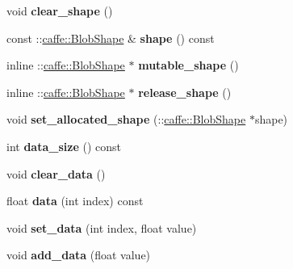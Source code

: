 \begin{DoxyCompactItemize}
void {\bfseries clear\+\_\+shape} ()
\item 
\mbox{\label{classcaffe_1_1_blob_proto_a7e21c24dadaf776e0b18e2d136d194e3}} 
const \+::\mbox{\hyperlink{classcaffe_1_1_blob_shape}{caffe\+::\+Blob\+Shape}} \& {\bfseries shape} () const
\item 
\mbox{\label{classcaffe_1_1_blob_proto_a5891dfd31c064e209220be301d7b4fa3}} 
inline \+::\mbox{\hyperlink{classcaffe_1_1_blob_shape}{caffe\+::\+Blob\+Shape}} $\ast$ {\bfseries mutable\+\_\+shape} ()
\item 
\mbox{\label{classcaffe_1_1_blob_proto_a0181155d1cedd14c5ea18860e43752b0}} 
inline \+::\mbox{\hyperlink{classcaffe_1_1_blob_shape}{caffe\+::\+Blob\+Shape}} $\ast$ {\bfseries release\+\_\+shape} ()
\item 
\mbox{\label{classcaffe_1_1_blob_proto_aef1b6e9464f1a2f76d703b7746fcdd61}} 
void {\bfseries set\+\_\+allocated\+\_\+shape} (\+::\mbox{\hyperlink{classcaffe_1_1_blob_shape}{caffe\+::\+Blob\+Shape}} $\ast$shape)
\item 
\mbox{\label{classcaffe_1_1_blob_proto_a5bf467af1332258dc23e3b8247e4c87a}} 
int {\bfseries data\+\_\+size} () const
\item 
\mbox{\label{classcaffe_1_1_blob_proto_a36aca8b30fa94970b8a67e17a9f56292}} 
void {\bfseries clear\+\_\+data} ()
\item 
\mbox{\label{classcaffe_1_1_blob_proto_a1621ebd555262b63222bf5069fcf00f0}} 
float {\bfseries data} (int index) const
\item 
\mbox{\label{classcaffe_1_1_blob_proto_aeebb47f4e3c8acbccd19954df7ad62d6}} 
void {\bfseries set\+\_\+data} (int index, float value)
\item 
\mbox{\label{classcaffe_1_1_blob_proto_a8a2749e8fe5a28a3b04e73c2aae66d3d}} 
void {\bfseries add\+\_\+data} (float value)
\item 
\mbox{\label{classcaffe_1_1_blob_proto_aecf2ee5a6fec4691ba490e55aff0f563}} 

\end{DoxyCompactItemize}
